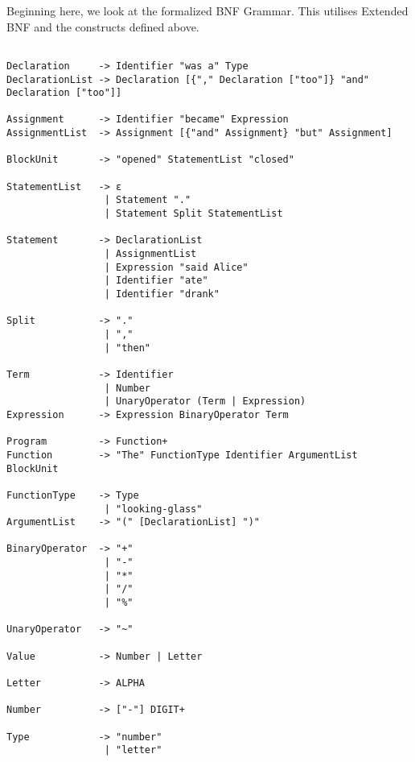 \documentclass[a4wide, 11pt]{article}
\begin{document}
Beginning here, we look at the formalized BNF Grammar. This utilises Extended BNF and the constructs defined above.

\begin{verbatim}

Declaration     -> Identifier "was a" Type
DeclarationList -> Declaration [{"," Declaration ["too"]} "and" Declaration ["too"]]

Assignment      -> Identifier "became" Expression
AssignmentList  -> Assignment [{"and" Assignment} "but" Assignment]

BlockUnit       -> "opened" StatementList "closed"

StatementList   -> ε
                 | Statement "."
                 | Statement Split StatementList
               
Statement       -> DeclarationList
                 | AssignmentList
                 | Expression "said Alice"
                 | Identifier "ate"
                 | Identifier "drank"

Split           -> "."
                 | ","
                 | "then"

Term            -> Identifier
                 | Number
                 | UnaryOperator (Term | Expression)
Expression      -> Expression BinaryOperator Term

Program         -> Function+
Function        -> "The" FunctionType Identifier ArgumentList BlockUnit

FunctionType    -> Type
                 | "looking-glass"
ArgumentList    -> "(" [DeclarationList] ")"

BinaryOperator  -> "+"
                 | "-"
                 | "*"
                 | "/" 
                 | "%"

UnaryOperator   -> "~" 

Value           -> Number | Letter

Letter          -> ALPHA

Number          -> ["-"] DIGIT+

Type            -> "number"
                 | "letter"

\end{verbatim}




\end{document}
